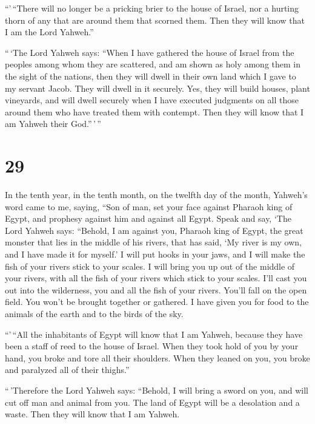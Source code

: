  ``'\,``There will no longer be a pricking brier to the
house of Israel, nor a hurting thorn of any that are around them that
scorned them. Then they will know that I am the Lord Yahweh.''

 ``\,`The Lord Yahweh says: ``When I have gathered the
house of Israel from the peoples among whom they are scattered, and am
shown as holy among them in the sight of the nations, then they will
dwell in their own land which I gave to my servant Jacob.
 They will dwell in it securely. Yes, they will build
houses, plant vineyards, and will dwell securely when I have executed
judgments on all those around them who have treated them with contempt.
Then they will know that I am Yahweh their God.''\,'\,''

\hypertarget{section-27}{%
\section{29}\label{section-27}}

 In the tenth year, in the tenth month, on the twelfth day
of the month, Yahweh's word came to me, saying,  ``Son of
man, set your face against Pharaoh king of Egypt, and prophesy against
him and against all Egypt.  Speak and say, `The Lord
Yahweh says: ``Behold, I am against you, Pharaoh king of Egypt, the
great monster that lies in the middle of his rivers, that has said, `My
river is my own, and I have made it for myself.'  I will
put hooks in your jaws, and I will make the fish of your rivers stick to
your scales. I will bring you up out of the middle of your rivers, with
all the fish of your rivers which stick to your scales. 
I'll cast you out into the wilderness, you and all the fish of your
rivers. You'll fall on the open field. You won't be brought together or
gathered. I have given you for food to the animals of the earth and to
the birds of the sky.

 ``'\,``All the inhabitants of Egypt will know that I am
Yahweh, because they have been a staff of reed to the house of Israel.
 When they took hold of you by your hand, you broke and
tore all their shoulders. When they leaned on you, you broke and
paralyzed all of their thighs.''

 ``\,'Therefore the Lord Yahweh says: ``Behold, I will
bring a sword on you, and will cut off man and animal from you.
 The land of Egypt will be a desolation and a waste. Then
they will know that I am Yahweh.

